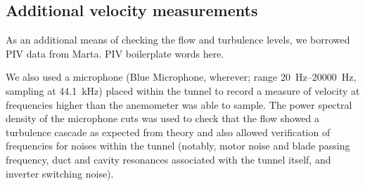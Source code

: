 \documentclass{jfm}
\begin{document}
\subsection{Additional velocity measurements}
As an additional means of checking the flow and turbulence levels, we borrowed PIV data from Marta.  PIV boilerplate words here. 

We also used a microphone (Blue Microphone, wherever; range \SIrange{20}{20000}{\hertz}, sampling at \SI{44.1}{\kilo\hertz}) placed within the tunnel to record a measure of velocity at frequencies higher than the anemometer was able to sample.  The power spectral density of the microphone cuts was used to check that the flow showed a turbulence cascade as expected from theory and also allowed verification of frequencies for noises within the tunnel (notably, motor noise and blade passing frequency, duct and cavity resonances associated with the tunnel itself, and inverter switching noise). 



\end{document}
